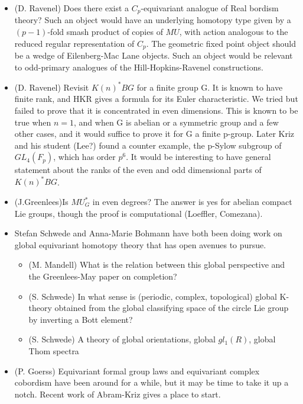 \documentclass[12pt,titlepage]{article}
\theoremstyle{plain}
\theoremstyle{definition}
\theoremstyle{remark}
\begin{document}
\begin{itemize}%
\item (D. Ravenel) Does there exist a $C_p$-equivariant analogue of Real bordism theory? Such an object would have an underlying homotopy type given by a $(p-1)$-fold smash product of copies of $MU$, with action analogous to the reduced regular representation of $C_p$. The geometric fixed point object should be a wedge of Eilenberg-Mac Lane objects. Such an object would be relevant to odd-primary analogues of the Hill-Hopkins-Ravenel constructions.


\item (D. Ravenel) Revisit $K(n)^*BG$ for a finite group G. It is known to have finite rank, and HKR gives a formula for its Euler characteristic. We tried but failed to prove that it is concentrated in even dimensions. This is known to be true when $n=1$, and when G is abelian or a symmetric group and a few other cases, and it would suffice to prove it for G a finite p-group. Later Kriz and his student (Lee?) found a counter example, the p-Sylow subgroup of $GL_4 (F_p)$, which has order $p^6$. It would be interesting to have general statement about the ranks of the even and odd dimensional parts of $K(n)^*BG$.


\item (J.Greenlees)Is $MU_G^*$ in even degrees? The answer is yes for abelian compact Lie groups, though the proof is computational (Loeffler, Comezana).


\item Stefan Schwede and Anna-Marie Bohmann have both been doing work on global equivariant homotopy theory that has open avenues to pursue.

\begin{itemize}%
\item (M. Mandell) What is the relation between this global perspective and the Greenlees-May paper on completion?


\item (S. Schwede) In what sense is (periodic, complex, topological) global K-theory obtained from the global classifying space of the circle Lie group by inverting a Bott element?


\item (S. Schwede) A theory of global orientations, global $gl_1(R)$, global Thom spectra



\end{itemize}

\item (P. Goerss) Equivariant formal group laws and equivariant complex cobordism have been around for a while, but it may be time to take it up a notch. Recent work of Abram-Kriz gives a place to start.


\end{itemize}
\end{document}
